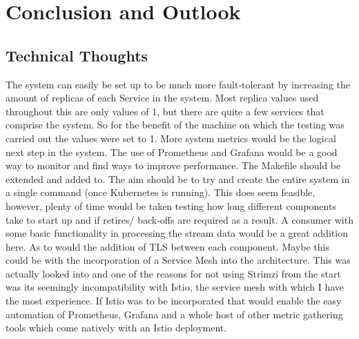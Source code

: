 \chapter{Conclusion and Outlook}
\label{chap:conclusion}

\section{Technical Thoughts}
\begin{flushleft}
	The system can easily be set up to be much more fault-tolerant by increasing the amount of replicas of each Service in the system.
	Most replica values used throughout this are only values of 1, but there are quite a few services that comprise the system. So for the
	benefit of the machine on which the testing was carried out the values were set to 1.
	\bigbreak
	More system metrics would be the logical next step in the system. The use of Prometheus and Grafana would be a good way to monitor and
	find ways to improve performance.
	\bigbreak
	The Makefile should be extended and added to. The aim should be to try and create the entire system in a single command (once Kubernetes
	is running). This does seem feasible, however, plenty of time would be taken testing how long different components take to start up and if
	retires/ back-offs are required as a result.
	\bigbreak
	A consumer with some basic functionality in processing the stream data would be a great addition here.
	\bigbreak
	As to would the addition of TLS between each component. Maybe this could be with the incorporation of a Service Mesh into the architecture.
	This was actually looked into and one of the reasons for not using Strimzi from the start was its seemingly incompatibility with Istio,
	the service mesh with which I have the most experience. If Istio was to be incorporated that would enable the easy automation of Prometheus,
	Grafana and a whole host of other metric gathering tools which come natively with an Istio deployment.


\end{flushleft}
